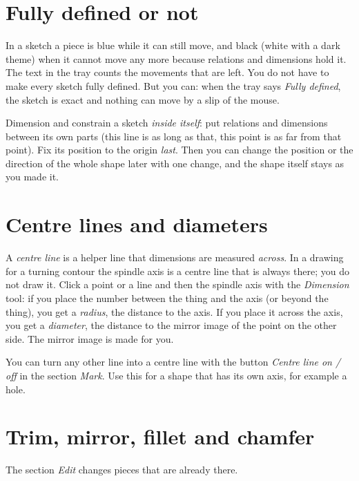 \section{Fully defined or not}\label{sec:sketch:defined}

In a sketch a piece is \textcolor{blue!60!black}{blue} while it can still move, and black (white with a dark theme) when it cannot move any more because relations and dimensions hold it. The text in the tray counts the movements that are left. You do not have to make every sketch fully defined. But you can: when the tray says \emph{Fully defined}, the sketch is exact and nothing can move by a slip of the mouse.

\begin{tipbox}
Dimension and constrain a sketch \emph{inside itself}: put relations and dimensions between its own parts (this line is as long as that, this point is as far from that point). Fix its position to the origin \emph{last}. Then you can change the position or the direction of the whole shape later with one change, and the shape itself stays as you made it.
\end{tipbox}

\section{Centre lines and diameters}\label{sec:sketch:centre}

A \emph{centre line} is a helper line that dimensions are measured \emph{across}. In a drawing for a turning contour the spindle axis is a centre line that is always there; you do not draw it. Click a point or a line and then the spindle axis with the \emph{Dimension} tool: if you place the number between the thing and the axis (or beyond the thing), you get a \emph{radius}, the distance to the axis. If you place it across the axis, you get a \emph{diameter}, the distance to the mirror image of the point on the other side. The mirror image is made for you.

You can turn any other line into a centre line with the button \emph{Centre line on / off} in the section \emph{Mark}. Use this for a shape that has its own axis, for example a hole.

\section{Trim, mirror, fillet and chamfer}\label{sec:sketch:edit}

The section \emph{Edit} changes pieces that are already there.

